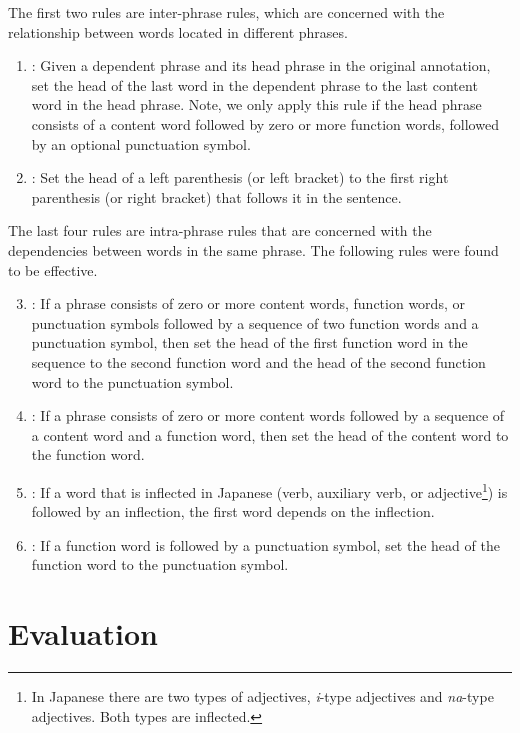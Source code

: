 \documentclass[english]{jnlp_1.4}
\def\ruleL{}
\def\ruleP{}
\def\ruleS{}
\def\ruleC{}
\def\ruleI{}
\def\ruleF{}
\begin{document}
The first two rules are inter-phrase rules, which are concerned with the relationship between words
located in different phrases.

\begin{enumerate}
\item \ruleL: Given a dependent phrase and its head phrase in the original annotation, set the
  head of the last word in the dependent phrase to the last content word in the head phrase. Note,
  we only apply this rule if the head phrase consists of a content word followed by zero or more
  function words, followed by an optional punctuation symbol.
\item \ruleP: Set the head of a left parenthesis (or left bracket) to the first right parenthesis (or right
  bracket) that follows it in the sentence.

\end{enumerate}

The last four rules are intra-phrase rules that are concerned with the
dependencies between words in the same phrase. The following rules were found to be effective.

\begin{enumerate}
\setcounter{enumi}{2} 
\item \ruleS: If a phrase consists of zero or more content words, function words, or punctuation symbols
  followed by a sequence of two function words and a punctuation symbol, then set the head of the
  first function word in the sequence to the second function word and the head of the second
  function word to the punctuation symbol.
\item \ruleC: If a phrase consists of zero or more content words followed by a sequence of a
  content word and a function word, then set the head of the content word to the function word.
\item \ruleI: If a word that is inflected in Japanese (verb, auxiliary verb,
  or adjective\footnote{In Japanese there are two types of adjectives, {\it i}-type adjectives and {\it na}-type
adjectives. Both types are inflected.}) is followed by an inflection, the first word depends on the inflection.
\item \ruleF: If a function word is followed by a punctuation symbol, set the head of the function word
  to the punctuation symbol.

\end{enumerate}


\section{Evaluation}
\label{sec:experiments}
\end{document}
